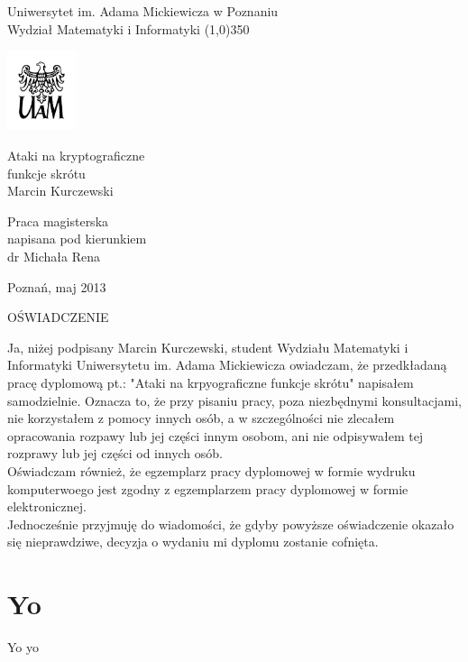 \documentclass[a4paper,twoside]{article}
\begin{document}
	\pagestyle{headings}

	\begin{titlepage}
		\begin{center}
		{\LARGE Uniwersytet im. Adama Mickiewicza w Poznaniu \\
		Wydział Matematyki i Informatyki }
		\line(1,0){350}

		\vspace{1cm}
		\includegraphics[width=2cm]{logo-uam/logo-uam.png}
		\vspace{1cm}

		\vspace{1cm}
		{\Huge Ataki na kryptograficzne \\ funkcje skrótu} \\[0.5cm]
		{\Large Marcin Kurczewski}
		\end{center}

		\vspace{3cm}
		\hspace{8cm}\parbox[l]{6cm}{\Large Praca magisterska \\
		napisana pod kierunkiem \\
		dr Michała Rena}

		\begin{center}
		\vspace{4cm}
		Poznań, maj 2013
		\end{center}

	\end{titlepage}


	\newpage
	\thispagestyle{empty}
	\begin{center}
		OŚWIADCZENIE
	\end{center}

	Ja, niżej podpisany Marcin Kurczewski, student Wydziału Matematyki i Informatyki Uniwersytetu im. Adama Mickiewicza owiadczam, że przedkładaną pracę dyplomową pt.: "Ataki na krpyograficzne funkcje skrótu" napisałem samodzielnie. Oznacza to, że przy pisaniu pracy, poza niezbędnymi konsultacjami, nie korzystałem z pomocy innych osób, a w szczególności nie zlecałem opracowania rozpawy lub jej części innym osobom, ani nie odpisywałem tej rozprawy lub jej części od innych osób. \\
	Oświadczam również, że egzemplarz pracy dyplomowej w formie wydruku komputerwoego jest zgodny z egzemplarzem pracy dyplomowej w formie elektronicznej. \\
	Jednocześnie przyjmuję do wiadomości, że gdyby powyższe oświadczenie okazało się nieprawdziwe, decyzja o wydaniu mi dyplomu zostanie cofnięta.


	\newpage

	\section {Yo}

	Yo yo
\end{document}
